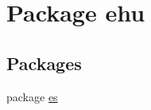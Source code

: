 \hypertarget{namespaceehu}{}\section{Package ehu}
\label{namespaceehu}
\subsection*{Packages}
\begin{DoxyCompactItemize}
\item 
package \mbox{\hyperlink{namespaceehu_1_1es}{es}}
\end{DoxyCompactItemize}
